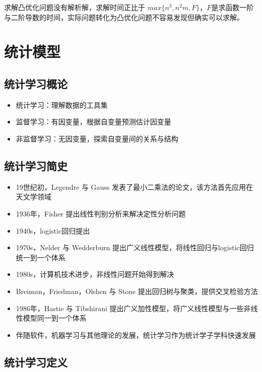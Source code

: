 \documentclass[]{book}
\providecommand{\tightlist}{%
  \setlength{\itemsep}{0pt}\setlength{\parskip}{0pt}}
\begin{document}
求解凸优化问题没有解析解，求解时间正比于 \(max\{ n^3,n^2m,F\}\)，\(F\)是求函数一阶与二阶导数的时间，实际问题转化为凸优化问题不容易发现但确实可以求解。

\hypertarget{mlsl}{%
\chapter{统计模型}\label{mlsl}}

\hypertarget{ux7edfux8ba1ux5b66ux4e60ux6982ux8bba}{%
\section{统计学习概论}\label{ux7edfux8ba1ux5b66ux4e60ux6982ux8bba}}

\begin{itemize}
\tightlist
\item
  统计学习：理解数据的工具集
\item
  监督学习：有因变量，根据自变量预测估计因变量
\item
  非监督学习：无因变量，探索自变量间的关系与结构
\end{itemize}

\hypertarget{ux7edfux8ba1ux5b66ux4e60ux7b80ux53f2}{%
\section{统计学习简史}\label{ux7edfux8ba1ux5b66ux4e60ux7b80ux53f2}}

\begin{itemize}
\tightlist
\item
  19世纪初，Legendre 与 Gauss 发表了最小二乘法的论文，该方法首先应用在天文学领域
\item
  1936年，Fisher 提出线性判别分析来解决定性分析问题
\item
  1940s，logistic回归提出
\item
  1970s，Nelder 与 Wedderburn 提出广义线性模型，将线性回归与logistic回归统一到一个体系
\item
  1980s，计算机技术进步，非线性问题开始得到解决
\item
  Breiman，Friedman，Olshen 与 Stone 提出回归树与聚类，提供交叉检验方法
\item
  1986年，Hastie 与 Tibshirani 提出广义加性模型，将广义线性模型与一些非线性模型同一到一个体系
\item
  伴随软件，机器学习与其他理论的发展，统计学习作为统计学子学科快速发展
\end{itemize}

\hypertarget{ux7edfux8ba1ux5b66ux4e60ux5b9aux4e49}{%
\section{统计学习定义}\label{ux7edfux8ba1ux5b66ux4e60ux5b9aux4e49}}
\end{document}
